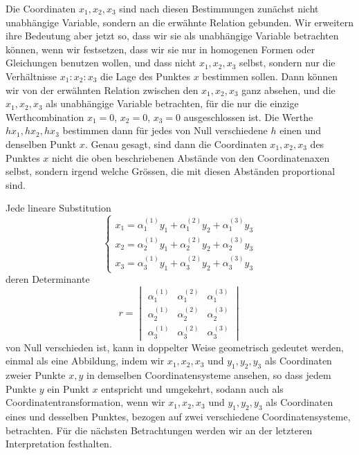 \documentclass[12pt,a4paper]{article}
\begin{document}
Die Coordinaten $x_1,x_2,x_3$ sind nach diesen Bestimmungen zun\"achst nicht unabh\"angige Variable, sondern an die erw\"ahnte Relation gebunden. Wir erweitern ihre Bedeutung aber jetzt so, dass wir sie als unabh\"angige Variable betrachten k\"onnen, wenn wir festsetzen, dass wir sie nur in homogenen Formen oder Gleichungen benutzen wollen, und dass nicht $x_1,x_2,x_3$ selbst, sondern nur die Verh\"altnisse $x_1:x_2:x_3$ die Lage des Punktes $x$ bestimmen sollen. Dann k\"onnen wir von der erw\"ahnten Relation zwischen den $x_1,x_2,x_3$ ganz absehen, und die $x_1,x_2,x_3$ als unabh\"angige Variable betrachten, f\"ur die nur die einzige Werthcombination $x_1=0$, $x_2=0$, $x_3=0$ ausgeschlossen ist. Die Werthe $hx_1,hx_2,hx_3$ bestimmen dann f\"ur jedes von Null verschiedene $h$ einen und denselben Punkt $x$. Genau gesagt, sind dann die Coordinaten $x_1,x_2,x_3$ des Punktes $x$ nicht die oben beschriebenen Abst\"ande von den Coordinatenaxen selbst, sondern irgend welche Gr\"ossen, die mit diesen Abst\"anden proportional sind.

Jede lineare Substitution
\begin{equation}
\tag{1}
\begin{cases}
x_1 = \alpha_1^{(1)} y_1 + \alpha_1^{(2)} y_2 + \alpha_1^{(3)} y_3\\
x_2 = \alpha_2^{(1)} y_1 + \alpha_2^{(2)} y_2 + \alpha_2^{(3)} y_3\\
x_3 = \alpha_3^{(1)} y_1 + \alpha_3^{(2)} y_2 + \alpha_3^{(3)} y_3
\end{cases}
\end{equation}
deren Determinante
\begin{equation}
\tag{2}
r =
\begin{vmatrix}
\alpha_1^{(1)} & \alpha_1^{(2)} & \alpha_1^{(3)}\\
\alpha_2^{(1)} & \alpha_2^{(2)} & \alpha_2^{(3)}\\
\alpha_3^{(1)} & \alpha_3^{(2)} & \alpha_3^{(3)}
\end{vmatrix}
\end{equation}
von Null verschieden ist, kann in doppelter Weise geometrisch gedeutet werden, einmal als eine Abbildung, indem wir $x_1,x_2,x_3$ und $y_1,y_2,y_3$ als Coordinaten zweier Punkte $x,y$ in demselben Coordinatensysteme ansehen, so dass jedem Punkte $y$ ein Punkt $x$ entspricht und umgekehrt, sodann auch als Coordinatentransformation, wenn wir $x_1,x_2,x_3$ und $y_1,y_2,y_3$ als Coordinaten eines und desselben Punktes, bezogen auf zwei verschiedene Coordinatensysteme, betrachten. F\"ur die n\"achsten Betrachtungen werden wir an der letzteren Interpretation festhalten.
\end{document}
